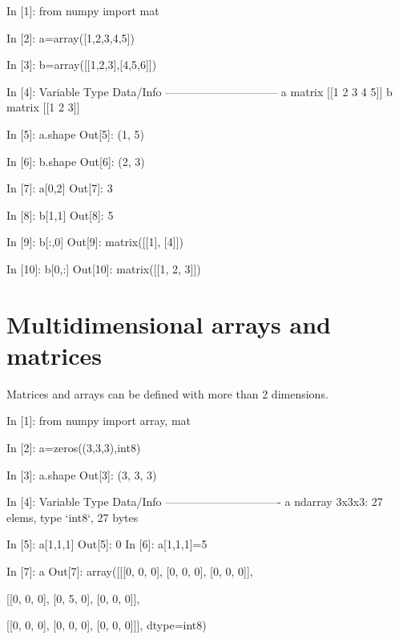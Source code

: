 \begin{code}
In [1]: from numpy import mat

In [2]: a=array([1,2,3,4,5])

In [3]: b=array([[1,2,3],[4,5,6]])

In [4]: %
Variable   Type      Data/Info
------------------------------
a          matrix    [[1 2 3 4 5]]
b          matrix    [[1 2 3]\n [4 5 6]]

In [5]: a.shape
Out[5]: (1, 5)

In [6]: b.shape
Out[6]: (2, 3)
\end{code}

\begin{code}
In [7]: a[0,2]
Out[7]: 3

In [8]: b[1,1]
Out[8]: 5

In [9]: b[:,0]
Out[9]: 
matrix([[1],
        [4]])

In [10]: b[0,:]
Out[10]: matrix([[1, 2, 3]])
\end{code}

\section{Multidimensional arrays and matrices}
Matrices and arrays can be defined with more than 2 dimensions.

\begin{code}
In [1]: from numpy import array, mat

In [2]: a=zeros((3,3,3),int8)

In [3]: a.shape
Out[3]: (3, 3, 3)

In [4]: %
Variable   Type       Data/Info
-------------------------------
a          ndarray    3x3x3: 27 elems, type `int8`, 27 bytes

In [5]: a[1,1,1]
Out[5]: 0
In [6]: a[1,1,1]=5

In [7]: a
Out[7]: 
array([[[0, 0, 0],
        [0, 0, 0],
        [0, 0, 0]],

       [[0, 0, 0],
        [0, 5, 0],
        [0, 0, 0]],

       [[0, 0, 0],
        [0, 0, 0],
        [0, 0, 0]]], dtype=int8)

\end{code}

% 
% 
% 
% 
% 
% 

